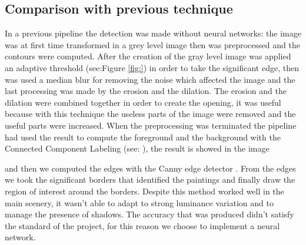 \subsection{Comparison with previous technique}
In a previous pipeline the detection was made without neural networks:
the image was at first time transformed in a grey level image then was preprocessed and the contours were computed. After the creation of the gray level image was applied an adaptive threshold (see:Figure \ref{fig:}) in order to take the significant edge, then was used a median blur for removing the noise which affected the image and the last processing was made by the erosion and the dilation.
The erosion and the dilation were combined together in order to create the opening, it was useful because with this technique the useless parts of the image were removed and the useful parts were increased. 
When the preprocessing was terminated the pipeline had used the result to compute the foreground and the background with the Connected Component Labeling (see: \cite{Grana_ccl}), the result is showed in the image 



and then we computed the edges with the Canny edge detector \cite{canny}. From the edges we took the significant borders that identified the paintings and finally draw the region of interest around the borders. Despite this method worked well in the main scenery, it wasn't able to adapt to strong luminance variation and to manage the presence of shadows.
The accuracy that was produced didn't satisfy the standard of the project, for this reason we choose to implement a neural network.

